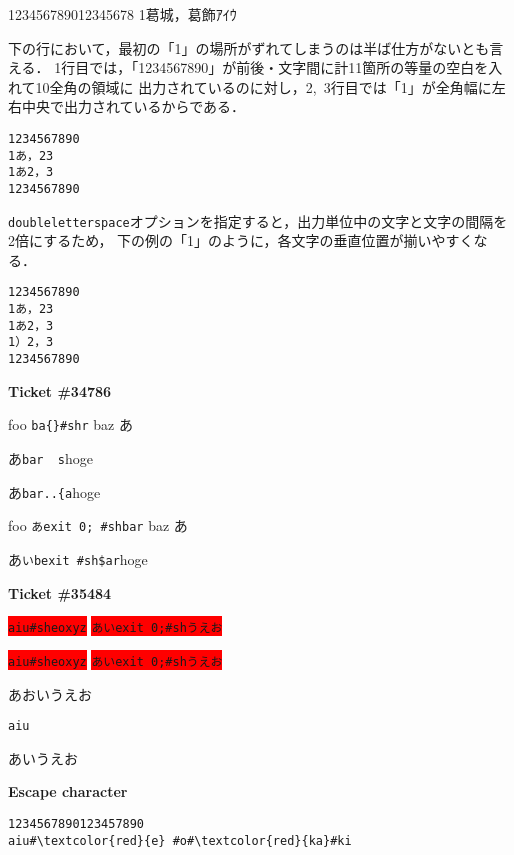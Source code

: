 \documentclass{article}
\begin{document}
\begin{LTXexample}[escapechar=\%,vsraw, basicstyle=\tt]
123456789012345678
1葛󠄀城，葛󠄁飾ｱｲｳ
\end{LTXexample}

\newpage

下の行において，最初の「1」の場所がずれてしまうのは半ば仕方がないとも言える．
1行目では，「1234567890」が前後・文字間に計11箇所の等量の空白を入れて10全角の領域に
出力されているのに対し，2,~3行目では「1」が全角幅に左右中央で出力されているからである．
\begin{lstlisting}[escapechar=\%,vsraw, basewidth=1\zw, basicstyle=\tt]
1234567890
1あ，23
1あ2，3
1234567890
\end{lstlisting}

\texttt{doubleletterspace}オプションを指定すると，出力単位中の文字と文字の間隔を2倍にするため，
下の例の「1」のように，各文字の垂直位置が揃いやすくなる．
\begin{lstlisting}[escapechar=\%,doubleletterspace, basewidth=1\zw, basicstyle=\tt]
1234567890
1あ，23
1あ2，3
1）2，3
1234567890
\end{lstlisting}


\newpage
\textbf{Ticket \#34786}

foo \lstinline[basicstyle=\tt]!ba{}#shr! baz あ

あ\lstinline[basicstyle=\tt]{bar  s}hoge

あ\lstinline[basicstyle=\tt]{bar..{a}hoge

foo \lstinline[basicstyle=\tt\gtfamily]!あexit 0; #shbar! baz あ

あ\lstinline[basicstyle=\tt]{いbexit #sh$ar}hoge

\bigskip
\textbf{Ticket \#35484}

\colorbox{red}{\lstinline!aiu#sheoxyz!}
\colorbox{red}{\lstinline!あいexit 0;#shうえお!}


\colorbox{red}{\lstinline{aiu#sheoxyz}}
\colorbox{red}{\lstinline{あいexit 0;#shうえお}}

あおいうえお
\begin{lstlisting}[frame=single]
aiu
\end{lstlisting}
あいうえお

\bigskip
\textbf{Escape character}
\begin{lstlisting}[escapechar=\#,basicstyle=\ttfamily]
1234567890123457890
aiu#\textcolor{red}{e} #o#\textcolor{red}{ka}#ki
\end{lstlisting}
\end{document}
